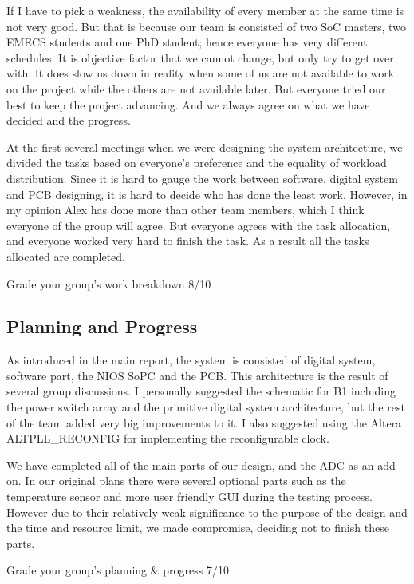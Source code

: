 If I have to pick a weakness, the availability of every member at the same time is not very good. But that is because our team is consisted of two SoC masters, two EMECS students and one PhD student; hence everyone has very different schedules. It is objective factor that we cannot change, but only try to get over with. It does slow us down in reality when some of us are not available to work on the project while the others are not available later. But everyone tried our best to keep the project advancing. And we always agree on what we have decided and the progress.

At the first several meetings when we were designing the system architecture, we divided the tasks based on everyone’s preference and the equality of workload distribution. Since it is hard to gauge the work between software, digital system and PCB designing, it is hard to decide who has done the least work. However, in my opinion Alex has done more than other team members, which I think everyone of the group will agree. But everyone agrees with the task allocation, and everyone worked very hard to finish the task. As a result all the tasks allocated are completed.

Grade your group’s work breakdown		8/10



\subsection{Planning and Progress}

As introduced in the main report, the system is consisted of digital system, software part, the NIOS SoPC and the PCB. This architecture is the result of several group discussions. I personally suggested the schematic for B1 including the power switch array and the primitive digital system architecture, but the rest of the team added very big improvements to it. I also suggested using the Altera ALTPLL\_RECONFIG for implementing the reconfigurable clock.

We have completed all of the main parts of our design, and the ADC as an add-on. In our original plans there were several optional parts such as the temperature sensor and more user friendly GUI during the testing process. However due to their relatively weak significance to the purpose of the design and the time and resource limit, we made compromise, deciding not to finish these parts.

Grade your group’s planning \& progress	7/10



